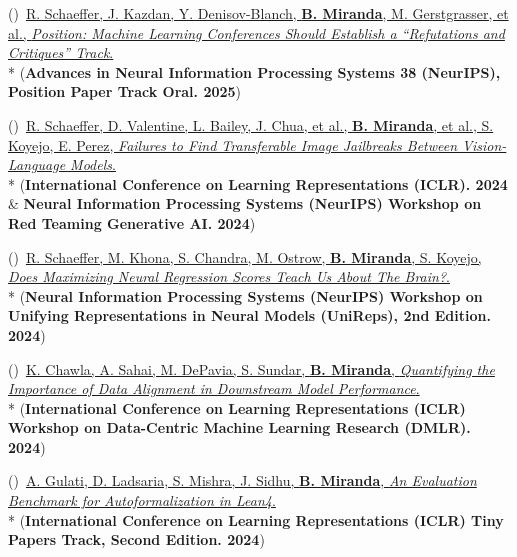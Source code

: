 \documentclass{article}
\newenvironment{changemargin}[2]{%
  \begin{list}{}{%
    \setlength{\topsep}{0pt}%
    \setlength{\leftmargin}{#1}%
    \setlength{\rightmargin}{#2}%
    \setlength{\listparindent}{\parindent}%
    \setlength{\itemindent}{\parindent}%
    \setlength{\parsep}{\parskip}%
  }%
  \item[]}{\end{list}
}
\newenvironment{body} {
		\vspace*{-16pt}
		\begin{changemargin}{-0.25in}{-0.5in}
	  }
		{\end{changemargin}\vspace{8pt plus 12pt}
	}
\newcounter{pubnum}
\newcommand{\pubitem}{\stepcounter{pubnum}(\thepubnum)~}
\begin{document}
\begin{body}
    \vspace{10pt}
    \pubitem \href{https://papers.nips.cc/paper_files/paper/2025/hash/9118ad115831e52cfeec1acd40c6e0f3-Abstract-Position_Paper_Track.html}
    {R. Schaeffer, J. Kazdan, Y. Denisov-Blanch, \textbf{B. Miranda}, M. Gerstgrasser, et al.,
    \emph{Position: Machine Learning Conferences Should Establish a ``Refutations and Critiques'' Track}.}
    \\*
    (\textbf{Advances in Neural Information Processing Systems 38 (NeurIPS), Position Paper Track Oral. 2025})

    \vspace{10pt}
    \pubitem \href{https://openreview.net/forum?id=wvFnqVVUhN}
    {R. Schaeffer, D. Valentine, L. Bailey, J. Chua, et al., \textbf{B. Miranda}, et al., S. Koyejo, E. Perez,
    \emph{Failures to Find Transferable Image Jailbreaks Between Vision-Language Models}.}
    \\*
    (\textbf{International Conference on Learning Representations (ICLR). 2024} \& \textbf{Neural Information Processing Systems (NeurIPS) Workshop on Red Teaming Generative AI. 2024})

    \vspace{10pt}
    \pubitem \href{https://openreview.net/forum?id=f6IB0WrOKS}
    {R. Schaeffer, M. Khona, S. Chandra, M. Ostrow, \textbf{B. Miranda}, S. Koyejo,
    \emph{Does Maximizing Neural Regression Scores Teach Us About The Brain?}.}
    \\*
    (\textbf{Neural Information Processing Systems (NeurIPS) Workshop on Unifying Representations in Neural Models (UniReps), 2nd Edition. 2024})

    \vspace{10pt}
    \pubitem \href{https://arxiv.org/abs/2501.08496}
    {K. Chawla, A. Sahai, M. DePavia, S. Sundar, \textbf{B. Miranda},
    \emph{Quantifying the Importance of Data Alignment in Downstream Model Performance}.}
    \\*
    (\textbf{International Conference on Learning Representations (ICLR) Workshop on Data-Centric Machine Learning Research (DMLR). 2024})

    \vspace{10pt}
    \pubitem \href{https://arxiv.org/abs/2406.06555}
    {A. Gulati, D. Ladsaria, S. Mishra, J. Sidhu, \textbf{B. Miranda},
    \emph{An Evaluation Benchmark for Autoformalization in Lean4}.}
    \\*
    (\textbf{International Conference on Learning Representations (ICLR) Tiny Papers Track, Second Edition. 2024})


\end{body}
\end{document}
